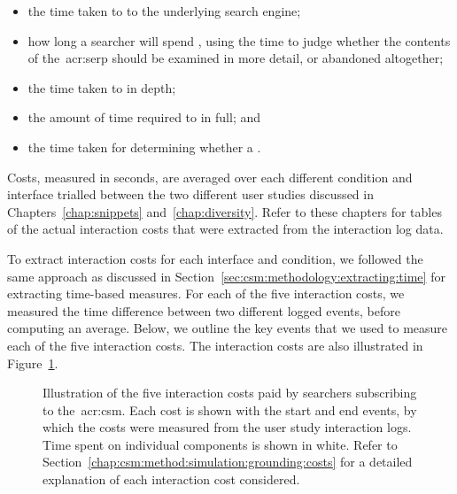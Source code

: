 \begin{itemize}
    \item{the time taken to  to the underlying search engine;}
    \item{how long a searcher will spend , using the time to judge whether the contents of the~\gls{acr:serp} should be examined in more detail, or abandoned altogether;}
    \item{the time taken to  in depth;}
    \item{the amount of time required to  in full; and}
    \item{the time taken for determining whether a .}
\end{itemize}

Costs, measured in seconds, are averaged over each different condition and interface trialled between the two different user studies discussed in Chapters~\ref{chap:snippets} and~\ref{chap:diversity}. Refer to these chapters for tables of the actual interaction costs that were extracted from the interaction log data.

To extract interaction costs for each interface and condition, we followed the same approach as discussed in Section~\ref{sec:csm:methodology:extracting:time} for extracting time-based measures. For each of the five interaction costs, we measured the time difference between two different logged events, before computing an average. Below, we outline the key events that we used to measure each of the five interaction costs. The interaction costs are also illustrated in Figure~\ref{fig:costs}.

\begin{figure}[t!]
    \centering
    \caption[Interaction costs]{Illustration of the five interaction costs paid by searchers subscribing to the~\gls{acr:csm}. Each cost is shown with the start and end events, by which the costs were measured from the user study interaction logs. Time spent on individual components is shown in white. Refer to Section~\ref{chap:csm:method:simulation:grounding:costs} for a detailed explanation of each interaction cost considered.}
    \label{fig:costs}
\end{figure}


